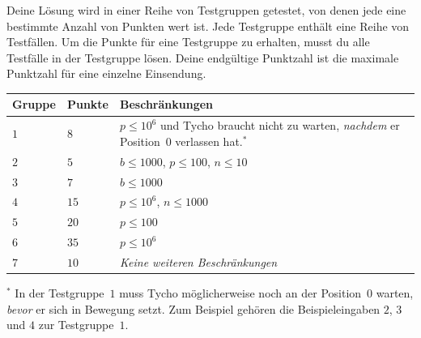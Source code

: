 Deine Lösung wird in einer Reihe von Testgruppen getestet, von denen jede eine bestimmte Anzahl von Punkten wert ist.
Jede Testgruppe enthält eine Reihe von Testfällen.
Um die Punkte für eine Testgruppe zu erhalten, musst du alle Testfälle in der Testgruppe lösen.
Deine endgültige Punktzahl ist die maximale Punktzahl für eine einzelne Einsendung.

\medskip
\begin{tabular}{lll}
Gruppe & Punkte & Beschränkungen \\\hline
  $1$ & $8$  & $p\leq 10^6$ und Tycho braucht nicht zu warten, \emph{nachdem} er Position~$0$ verlassen hat.$^*$ \\ %
  $2$ & $5$  & $b\leq 1000$, $p\leq 100$, $n\leq 10$ \\
  $3$ & $7$  & $b\leq 1000$ \\
  $4$ & $15$ & $p\leq 10^6$, $n\leq 1000$\\
  $5$ & $20$ & $p\leq 100$\\
  $6$ & $35$ & $p\leq 10^6$\\
  $7$ & $10$ & \emph{Keine weiteren Beschränkungen}
\end{tabular}

\medskip
\noindent $^*$ In der Testgruppe~$1$ muss Tycho möglicherweise noch an der Position~$0$ warten, \emph{bevor} er sich in Bewegung setzt.
Zum Beispiel gehören die Beispieleingaben $2$, $3$ und $4$ zur Testgruppe~$1$.
